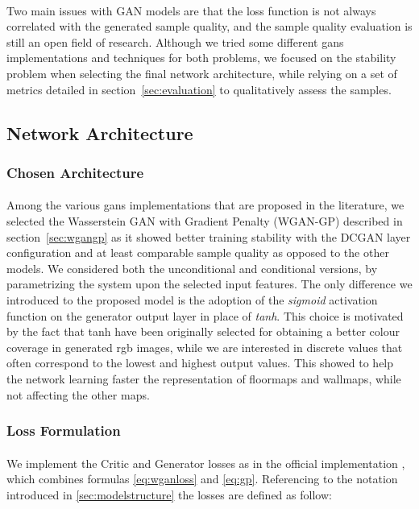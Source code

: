 \paragraph{} Two main issues with GAN models are that the loss function is not always correlated with the generated sample quality, and the sample quality evaluation is still an open field of research. Although we tried some different \glspl{gan} implementations and techniques for both problems, we focused on the stability problem when selecting the final network architecture, while relying on a set of metrics detailed in section~\ref{sec:evaluation} to qualitatively assess the samples. 

\subsection{Network Architecture}
\label{sec:networkarch}

\subsubsection{Chosen Architecture} 
\paragraph{} Among the various \glspl{gan} implementations that are proposed in the literature, we selected the Wasserstein GAN with Gradient Penalty \cite{wgangp} (WGAN-GP) described in section~\ref{sec:wgangp} as it showed better training stability with the DCGAN layer configuration and at least comparable sample quality as opposed to the other models. We considered both the unconditional and conditional versions, by parametrizing the system upon the selected input features. The only difference we introduced to the proposed model is the adoption of the \textit{sigmoid} activation function on the generator output layer in place of \textit{tanh}. This choice is motivated by the fact that tanh have been originally selected for obtaining a better colour coverage in generated rgb images, while we are interested in discrete values that often correspond to the lowest and highest output values. This showed to help the network learning faster the representation of \glspl{floormap} and \glspl{wallmap}, while not affecting the other maps.


\subsubsection{Loss Formulation}
\paragraph{} We implement the Critic and Generator losses as in the  official implementation \cite{wgangp-imple}, which combines formulas \ref{eq:wganloss} and \ref{eq:gp}. Referencing to the notation introduced in \ref{sec:modelstructure} the losses are defined as follow:

